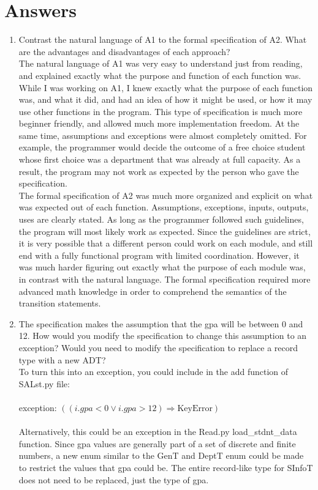 \documentclass[12pt]{article}
\begin{document}
\section{Answers}

\begin{enumerate}[label=\alph*]
\item Contrast the natural language of A1 to the formal specification of A2. What are the advantages and disadvantages of each approach? \\ 

The natural language of A1 was very easy to understand just from reading, and explained exactly what the purpose and function of each function was. While I was working on A1, I knew exactly what the purpose of each function was, and what it did, and had an idea of how it might be used, or how it may use other functions in the program. This type of specification is much more beginner friendly, and allowed much more implementation freedom. At the same time, assumptions and exceptions were almost completely omitted. For example, the programmer would decide the outcome of a free choice student whose first choice was a department that was already at full capacity. As a result, the program may not work as expected by the person who gave the specification. \\ 

The formal specification of A2 was much more organized and explicit on what was expected out of each function. Assumptions, exceptions, inputs, outputs, uses are clearly stated. As long as the programmer followed such guidelines, the program will most likely work as expected. Since the guidelines are strict, it is very possible that a different person could work on each module, and still end with a fully functional program with limited coordination. However, it was much harder figuring out exactly what the purpose of each module was, in contrast with the natural language. The formal specification required more advanced math knowledge in order to comprehend the semantics of the transition statements.

\item The specification makes the assumption that the gpa will be between 0 and 12. How would you modify the specification to change this assumption to an exception? Would you need to modify the specification to replace a record type with a new ADT? \\ 

To turn this into an exception, you could include in the add function of SALst.py file:\\ \\ exception: $((i.gpa < 0 \vee i.gpa > 12)  \Rightarrow \text{KeyError} )$ \\ \\
Alternatively, this could be an exception in the Read.py load\_stdnt\_data function. Since gpa values are generally part of a set of discrete and finite numbers, a new enum similar to the GenT and DeptT enum could be made to restrict the values that gpa could be. The entire record-like type for SInfoT does not need to be replaced, just the type of gpa. \\


\end{enumerate}
\end{document}
